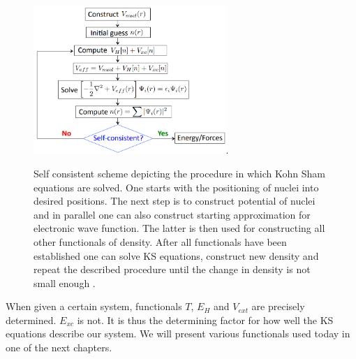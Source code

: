 \documentclass[openany, longbibliography,slovene,a4paper,12pt]{article}
\begin{document}
\begin{figure}
  \centering
  \includegraphics[width=0.65\textwidth]{self_consistent_scheme.png}.
  \caption{Self consistent scheme depicting the procedure in which Kohn Sham
    equations are solved. One starts with the positioning of nuclei into
    desired positions. The next step is to construct potential of nuclei and in
    parallel one can also construct starting approximation for electronic wave
    function. The latter is then used for constructing all other functionals of
    density. After all functionals have been established one can solve KS
    equations, construct new density and repeat the described procedure until
    the change in density is not small enough \cite{qe_tutorial}.
  }
  \label{self_consistent_scheme}
\end{figure}

When given a certain system, functionals $T$, $E_H$ and $V_{ext}$ are precisely
determined. $E_{xc}$ is not. It is thus the determining factor for how well the KS
equations describe our system. We will present various functionals used today in
one of the next chapters.
\end{document}
